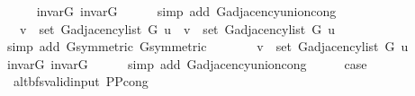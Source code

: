 \begin{isabellebody}
\ \ \ \ \isamarkupfalse%
\ invar{\isacharunderscore}{\kern0pt}G{}\ invar{\isacharunderscore}{\kern0pt}G{}\isanewline
\ \ \ \ \isamarkupfalse%
\ {\isacharparenleft}{\kern0pt}simp\ add{\isacharcolon}{\kern0pt}\ G{\isachardot}{\kern0pt}adjacency{\isacharunderscore}{\kern0pt}union{\isacharunderscore}{\kern0pt}cong{\isacharparenright}{\kern0pt}\isanewline
\ \ \isamarkupfalse%
\ \isamarkupfalse%
\ {\isachardoublequoteopen}{\isachardot}{\kern0pt}{\isachardot}{\kern0pt}{\isachardot}{\kern0pt}\ {\isasymlongleftrightarrow}\ v\ {\isasymin}\ set\ {\isacharparenleft}{\kern0pt}G{\isachardot}{\kern0pt}adjacency{\isacharunderscore}{\kern0pt}list\ G{}\ u{\isacharparenright}{\kern0pt}\ {\isasymor}\ v\ {\isasymin}\ set\ {\isacharparenleft}{\kern0pt}G{\isachardot}{\kern0pt}adjacency{\isacharunderscore}{\kern0pt}list\ G{}\ u{\isacharparenright}{\kern0pt}{\isachardoublequoteclose}\isanewline
\ \ \ \ \isamarkupfalse%
\ {\isacharparenleft}{\kern0pt}simp\ add{\isacharcolon}{\kern0pt}\ G{}{\isacharunderscore}{\kern0pt}symmetric\ G{}{\isacharunderscore}{\kern0pt}symmetric{\isacharparenright}{\kern0pt}\isanewline
\ \ \isamarkupfalse%
\ \isamarkupfalse%
\ {\isachardoublequoteopen}{\isachardot}{\kern0pt}{\isachardot}{\kern0pt}{\isachardot}{\kern0pt}\ {\isasymlongleftrightarrow}\ v\ {\isasymin}\ set\ {\isacharparenleft}{\kern0pt}G{\isachardot}{\kern0pt}adjacency{\isacharunderscore}{\kern0pt}list\ G\ u{\isacharparenright}{\kern0pt}{\isachardoublequoteclose}\isanewline
\ \ \ \ \isamarkupfalse%
\ invar{\isacharunderscore}{\kern0pt}G{}\ invar{\isacharunderscore}{\kern0pt}G{}\isanewline
\ \ \ \ \isamarkupfalse%
\ {\isacharparenleft}{\kern0pt}simp\ add{\isacharcolon}{\kern0pt}\ G{\isachardot}{\kern0pt}adjacency{\isacharunderscore}{\kern0pt}union{\isacharunderscore}{\kern0pt}cong{\isacharparenright}{\kern0pt}\isanewline
\ \ \isamarkupfalse%
\ \isamarkupfalse%
\ {\isacharquery}{\kern0pt}case\isanewline
\ \ \ \ \isacommand{{\isachardot}{\kern0pt}}\isamarkupfalse%
\isanewline
{}\isamarkupfalse%
%
\endisatagproof
{\isafoldproof}%
%
\isadelimproof
\isanewline
%
\endisadelimproof
\isanewline
{}\isamarkupfalse%
\isanewline
\isanewline
{}\isamarkupfalse%
\ {\isacharparenleft}{\kern0pt}\ alt{\isacharunderscore}{\kern0pt}bfs{\isacharunderscore}{\kern0pt}valid{\isacharunderscore}{\kern0pt}input{\isacharparenright}{\kern0pt}\ P{\isacharunderscore}{\kern0pt}P{\isacharprime}{\kern0pt}{\isacharprime}{\kern0pt}{\isacharunderscore}{\kern0pt}cong{\isacharcolon}{\kern0pt}\isanewline

\end{isabellebody}

